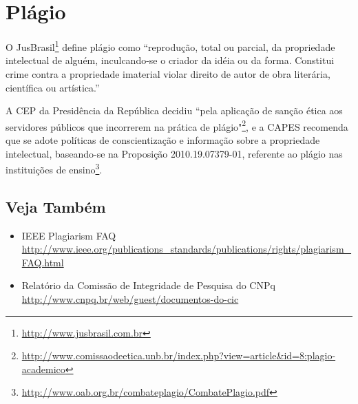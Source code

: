 \section{Plágio}%
O JusBrasil\footnote{\url{http://www.jusbrasil.com.br}} define plágio como
``reprodução, total ou parcial, da propriedade intelectual de alguém, inculcando-se
o criador da idéia ou da forma. Constitui crime contra a propriedade imaterial
violar direito de autor de obra literária, científica ou artística.''


A \acrfull{CEP} da Presidência da República decidiu  ``pela
aplicação de sanção ética aos servidores públicos que incorrerem na prática de
plágio"\footnote{\url{http://www.comissaodeetica.unb.br/index.php?view=article&id=8:plagio-academico}},
e a \acrfull{CAPES} recomenda que se adote políticas de conscientização e informação
sobre a propriedade intelectual, baseando-se na Proposição 2010.19.07379-01,
referente ao plágio nas instituições de ensino\footnote{\url{http://www.oab.org.br/combateplagio/CombatePlagio.pdf}}.


\subsection{Veja Também}
\begin{itemize}
	\item IEEE Plagiarism FAQ
		\\\url{http://www.ieee.org/publications_standards/publications/rights/plagiarism_FAQ.html}
	\item Relatório da Comissão de Integridade de Pesquisa do CNPq
		\\\url{http://www.cnpq.br/web/guest/documentos-do-cic}
\end{itemize}




